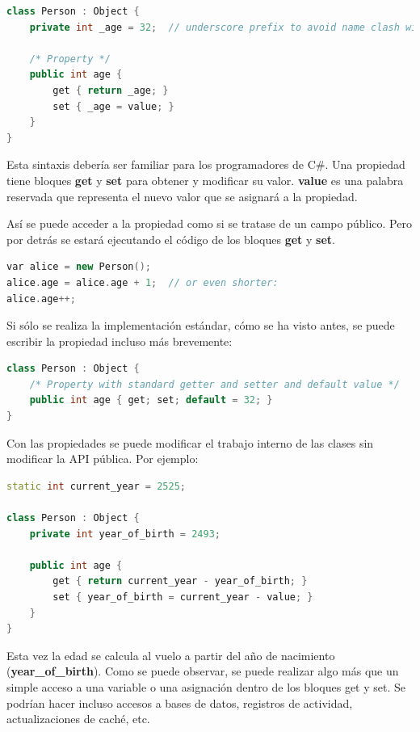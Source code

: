 \documentclass[12pt,twoside]{book}
\begin{document}
\begin{lstlisting}[language=C++]
class Person : Object {
	private int _age = 32;  // underscore prefix to avoid name clash with property
	
	/* Property */
	public int age {
		get { return _age; }
		set { _age = value; }
	}
}
\end{lstlisting}

Esta sintaxis debería ser familiar para los programadores de C\#. Una propiedad tiene bloques \textbf{get} y \textbf{set} para obtener y modificar su valor. \textbf{value} es una palabra reservada que representa el nuevo valor que se asignará a la propiedad.

Así se puede acceder a la propiedad como si se tratase de un campo público. Pero por detrás se estará ejecutando el código de los bloques \textbf{get} y \textbf{set}.

\begin{lstlisting}[language=C++]
var alice = new Person();
alice.age = alice.age + 1;  // or even shorter:
alice.age++;
\end{lstlisting}

Si sólo se realiza la implementación estándar, cómo se ha visto antes, se puede escribir la propiedad incluso más brevemente:

\begin{lstlisting}[language=C++]
class Person : Object {
	/* Property with standard getter and setter and default value */
	public int age { get; set; default = 32; }
}
\end{lstlisting}

Con las propiedades se puede modificar el trabajo interno de las clases sin modificar la API pública. Por ejemplo:

\begin{lstlisting}[language=C++]
static int current_year = 2525;

class Person : Object {
	private int year_of_birth = 2493;
	
	public int age {
		get { return current_year - year_of_birth; }
		set { year_of_birth = current_year - value; }
	}
}
\end{lstlisting}

Esta vez la edad se calcula al vuelo a partir del año de nacimiento (\textbf{year\_of\_birth}). Como se puede observar, se puede realizar algo más que un simple acceso a una variable o una asignación dentro de los bloques get y set. Se podrían hacer incluso accesos a bases de datos, registros de actividad, actualizaciones de caché, etc.
\end{document}
